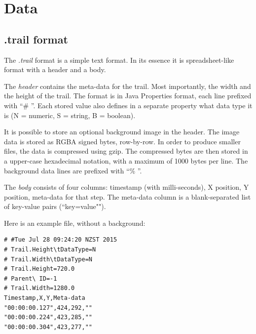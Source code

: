 \documentclass[a4paper]{book}
\begin{document}
\chapter{Data}
\section{.trail format}
The \textit{.trail} format is a simple text format. In its essence it is
spreadsheet-like format with a header and a body.

The \textit{header} contains the meta-data for the trail. Most importantly,
the width and the height of the trail. The format is in Java Properties format,
each line prefixed with ``\# ''. Each stored value also defines in a separate
property what data type it is (N = numeric, S = string, B = boolean).

It is possible to store an optional background image in the header. The image
data is stored as RGBA signed bytes, row-by-row. In order to produce smaller
files, the data is compressed using gzip\cite{gzip}. The compressed bytes are
then stored in a upper-case hexadecimal notation, with a maximum of 1000 bytes
per line. The background data lines are prefixed with ``\% ''.

The \textit{body} consists of four columns: timestamp (with milli-seconds), X position,
Y position, meta-data for that step. The meta-data column is a blank-separated list of
key-value pairs (``key=value"").

Here is an example file, without a background:

\begin{verbatim}
# #Tue Jul 28 09:24:20 NZST 2015
# Trail.Height\tDataType=N
# Trail.Width\tDataType=N
# Trail.Height=720.0
# Parent\ ID=-1
# Trail.Width=1280.0
Timestamp,X,Y,Meta-data
"00:00:00.127",424,292,""
"00:00:00.224",423,285,""
"00:00:00.304",423,277,""
\end{verbatim}


\end{document}
